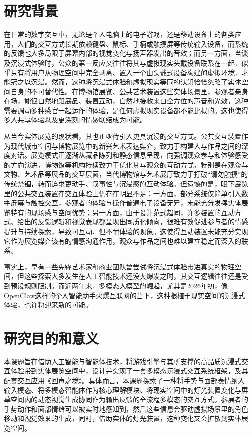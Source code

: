 \documentclass[bachelor]{njupthesis}
\begin{document}
\section{研究背景}

在日常的数字交互中，无论是个人电脑上的电子游戏，还是移动设备上的各类应用，人们的交互方式长期依赖键盘、鼠标、手柄或触摸屏等传统输入设备，而系统的反馈也大多局限于屏幕内部的视觉变化与扬声器发出的音效；而另一方面，当谈及沉浸式体验时，公众的第一反应又往往将其与虚拟现实头戴设备联系在一起，似乎只有将用户从物理空间中完全剥离、置入一个由头戴式设备构建的虚拟环境，才能冠之以沉浸。然而，这种将沉浸式体验和虚拟现实等同的认知恰恰忽略了实体空间自身的不可替代性。在博物馆展览、公共艺术装置这些实体场景里，参观者亲身在场，能很自然地跟展品、装置互动，自然地接收来自全方位的声音和光效，这种需要调动多种感官一起运作的体验，是任何虚拟现实设备都不能比拟的。这也使得多人共享体验以及更深刻的情感联结成为可能。

从当今实体展览的现状看，其也正亟待引入更具沉浸的交互方式。公共交互装置作为现代城市空间与博物展览中的新兴艺术表达媒介，致力于构建人与作品之间的深度对话。展览模式正逐渐从藏品陈列和静态信息呈现，向强调观众参与和体验感受的方向演进，博物馆等机构持续致力于优化其与观众的互动方式，特别是在观众与文物、艺术品等展品的交互层面，当代博物馆与艺术展厅致力于打破“请勿触摸”的传统禁锢，转而追求更动手、叙事性与沉浸感的互动体验。但遗憾的是，眼下展览里的公共交互装置在交互体验上仍存在明显不足：一方面，部分系统仅简单引入数字屏幕与触控交互，参观者的体验与操作普通电子设备无异，未能充分发挥实体展览特有的现场感与空间优势；另一方面，由于设计范式趋同，许多装置的互动方式、给出的反馈逻辑和视觉表现都呈现出同质化倾向，很难有效促进参与者的情感提升与持续探索，导致可互动、但不耐体验的现象。这使得互动装置未能充分实现它作为展览媒介该有的情感沟通作用，观众与作品之间也难以建立稳定而深入的联系。

事实上，早有一些先锋艺术家和商业团队曾尝试将沉浸式体验带进真实的物理空间，但这些探索大多发生在人工智能技术还没大爆发之时，其交互逻辑往往还是受到预设规则限制。而近两年来，多模态大模型的崛起，尤其是2026年初，像OpenClaw这样的个人智能助手火爆互联网的当下，这种根植于现实空间的沉浸式体验，也许将迎来新的可能。

\section{研究目的和意义}

本课题旨在借助人工智能与智能体技术，将游戏引擎与其所支撑的高品质沉浸式交互体验带到实体展览空间中，设计并实现了一套多模态沉浸式交互系统框架，及其配套交互应用《回声之境》。具体而言，本课题探索了一种将手势与面部表情纳入输入模态、将多模态智能体作为核心理解模块、将现实空间中的灯光装置变化与屏幕空间内的动态视觉生成协同作为输出反馈的全流程多模态的交互方式。参展者的手势动作和面部情绪可以被实时地感知到，然后这些信息会驱动虚拟场景里的角色移动和视觉效果的生成，同时，借助实体的灯光装置，这种变化又会扩散到实体展览空间。
\end{document}
